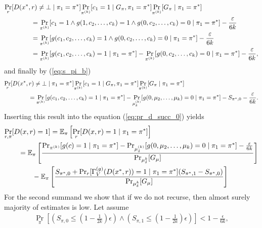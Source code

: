 \begin{align*}
  &\underset{r}{\Pr}[D(x^*,r) \neq \bot \mid \pi_1 = \pi^*]
  \underset{\pi^{(k)}}{\Pr}[c_1 = 1 \mid G_{\pi}, \pi_1 = \pi^*]
  \underset{\pi^{(k)}}{\Pr}[G_{\pi} \mid \pi_1 = \pi^*] \notag\\
  &\mbox\qquad\qquad = \underset{\pi^{(k)}}{\Pr}[c_1 = 1 \land g(1, c_2,\dots, c_k) = 1 \land g(0, c_2, \dots, c_k) = 0 \mid \pi_1 = \pi^*] - \frac{\varepsilon}{6k} \\
  &\mbox\qquad\qquad = \underset{\pi^{(k)}}{\Pr}[g(c_1, c_2,\dots, c_k) = 1 \land g(0, c_2, \dots, c_k) = 0 \mid \pi_1 = \pi^*] - \frac{\varepsilon}{6k} \\
  &\mbox\qquad\qquad = \underset{\pi^{(k)}}{\Pr}[g(c_1, c_2,\dots, c_k) = 1 \mid \pi_1 = \pi^*] -  \underset{\pi^{(k)}}{\Pr}[g(0, c_2, \dots, c_k) = 0 \mid \pi_1 = \pi^*] - \frac{\varepsilon}{6k},
\end{align*}
and finally by (\ref{eq:s_pi_b})
\begin{align}
  &\underset{r}{\Pr}[D(x^*,r) \neq \bot \mid \pi_1 = \pi^*]
  \underset{\pi^{(k)}}{\Pr}[c_1 = 1 \mid G_{\pi}, \pi_1 = \pi^*]
  \underset{\pi^{(k)}}{\Pr}[G_{\pi} \mid \pi_1 = \pi^*] \notag\\
  &\mbox\qquad\qquad = \underset{\pi^{(k)}}{\Pr}[g(c_1, c_2,\dots, c_k) = 1 \mid \pi_1 = \pi^*] -  \underset{\mu_{\delta}^{(k)}}{\Pr}[g(0, \mu_2, \dots, \mu_k) = 0 \mid \pi_1 = \pi^*]  - S_{\pi^*,0} - \frac{\varepsilon}{6k}.
\end{align}
Inserting this result into the equation (\ref{eq:pr_d_succ_0}) yields
\begin{align}
\label{eq:pr_d_succ_1}
  &\underset{r,\pi}{\Pr}[D(x,r) = 1] = \mathbb{E_{\pi}}\left[\underset{r}{\Pr}[D(x,r) = 1 \mid \pi_1 = \pi^*]\right] \notag\\
&\mbox\qquad = \mathbb{E}_{\pi}\left[\frac{{\Pr}_{\pi^{(k)}}[g(c) = 1 \mid \pi_1 = \pi^*] -
{\Pr}_{\mu_{\delta}^{(k)}}[g(0, \mu_2, \dots, \mu_k) = 0 \mid \pi_1 = \pi^*] - \frac{\varepsilon}{6k}} {{\Pr}_{\mu_{\delta}^{k}}[G_{\mu}]}\right] \notag\\
&\mbox\qquad\qquad - \mathbb{E}_{\pi}\left[\frac{
  S_{\pi^*,0} + \Pr_r [\Gamma_V^{(g)}(D(x^*,r)) = 1 \mid \pi_1 = \pi^*](S_{\pi^*,1} - S_{\pi^*,0})}
{{\Pr}_{\mu_{\delta}^{k}}[G_{\mu}]}\right]
\end{align}
For the second summand we show that if we do not recurse, then almost surely majority of estimates is low.
Let assume
\begin{align}
\underset{\pi}{\Pr}\left[\left(S_{\pi,0} \leq (1 - \frac{1}{2k})\epsilon\right) \land \left( S_{\pi,1} \leq (1-\frac{1}{2k})\epsilon\right)\right] < 1 - \frac{\epsilon}{6k},
\end{align}
